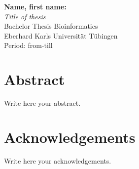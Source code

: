 \documentclass[twoside,12pt,a4paper]{article}
\begin{document}
\thispagestyle{empty}
\vspace*{\fill}
\begin{minipage}{11.2cm}
\textbf{Name, first name:}\\
\emph{Title of thesis}\\ Bachelor Thesis Bioinformatics\\
Eberhard Karls Universit\"at T\"ubingen\\
Period: from-till
\end{minipage}
\newpage


\setcounter{page}{1}


\section*{Abstract}

Write here your abstract.
\newpage
\section*{Acknowledgements}

Write here your acknowledgements.

\cleardoublepage


\renewcommand{\baselinestretch}{1.3}
\small\normalsize

\tableofcontents

\renewcommand{\baselinestretch}{1}
\small\normalsize

\listoftheorems

\cleardoublepage


\setcounter{page}{1}
\end{document}
